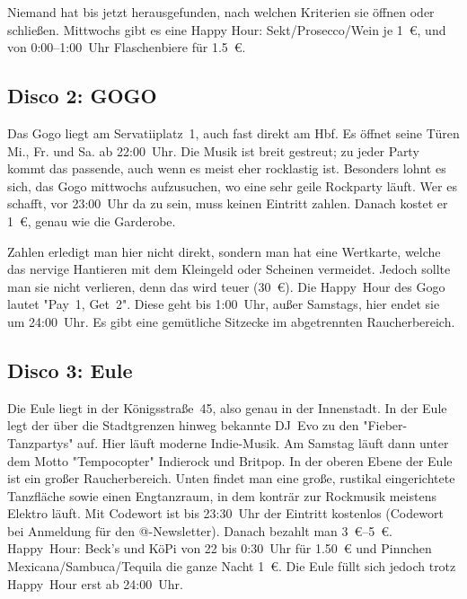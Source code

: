 \begin{multicols*}{2}
Niemand hat bis jetzt herausgefunden, nach welchen Kriterien sie öffnen oder schließen. Mittwochs gibt es eine Happy Hour: Sekt/Prosecco/Wein je \SI{1}{\euro}, und von 0:00--1:00~Uhr Flaschenbiere für \SI{1,5}{\euro}.

\begin{center}
\end{center}

\subsection*{Disco 2: GOGO}
Das Gogo liegt am Servatiiplatz~1, auch fast direkt am Hbf. Es öffnet seine Türen Mi., Fr. und Sa. ab 22:00~Uhr. Die Musik ist breit gestreut; zu jeder Party kommt das passende, auch wenn es meist eher rocklastig ist. Besonders lohnt es sich, das Gogo mittwochs aufzusuchen, wo eine sehr geile Rockparty läuft. Wer es schafft, vor 23:00~Uhr da zu sein, muss keinen Eintritt zahlen. Danach kostet er \SI{1}{\euro}, genau wie die Garderobe.

Zahlen erledigt man hier nicht direkt, sondern man hat eine Wertkarte, welche das nervige Hantieren mit dem Kleingeld oder Scheinen vermeidet. Jedoch sollte man sie nicht verlieren, denn das wird teuer (\SI{30}{\euro}). Die Happy~Hour des Gogo lautet "Pay~1, Get~2". Diese geht bis 1:00~Uhr, außer Samstags, hier endet sie um 24:00~Uhr. Es gibt eine gemütliche Sitzecke im abgetrennten Raucherbereich.

\begin{center}
\end{center}

\subsection*{Disco 3: Eule}
\vspace{-0.3cm}
Die Eule liegt in der Königsstraße~45, also genau in der Innenstadt. In der Eule legt der über die Stadtgrenzen hinweg bekannte DJ~Evo zu den "Fieber-Tanzpartys" auf. Hier läuft moderne Indie-Musik. Am Samstag läuft dann unter dem Motto "Tempocopter" Indierock und Britpop. In der oberen Ebene der Eule ist ein großer Raucherbereich. Unten findet man eine große, rustikal eingerichtete Tanzfläche sowie einen Engtanzraum, in dem konträr zur Rockmusik meistens Elektro läuft. Mit Codewort ist bis 23:30~Uhr der Eintritt kostenlos (Codewort bei Anmeldung für den @-Newsletter). Danach bezahlt man \SIrange{3}{5}{\euro}. Happy~Hour: Beck's und KöPi von 22 bis 0:30~Uhr für \SI{1,50}{\euro} und Pinnchen Mexicana/Sambuca/Tequila die ganze Nacht \SI{1}{\euro}. Die Eule füllt sich jedoch trotz Happy~Hour erst ab 24:00~Uhr.


\end{multicols*}
